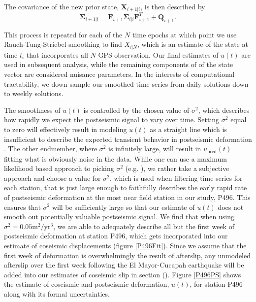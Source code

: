 \documentclass[12pt]{article}
\begin{document}
The covariance of the new prior state, $\mathbf{X}_{i+1|i}$, is then described by
\begin{equation}
  \mathbf{\Sigma}_{i+1|i} = \mathbf{F}_{i+1}\mathbf{\Sigma}_{i|i}\mathbf{F}^T_{i+1} + \mathbf{Q}_{i+1}.
\end{equation}

This process is repeated for each of the $N$ time epochs at which point we use Rauch-Tung-Striebel smoothing to find $X_{i|N}$, which is an estimate of the state at time $t_i$ that incorporates all $N$ GPS observation.  Our final estimates of $u(t)$ are used in subsequent analysis, while the remaining components of of the state vector are considered nuisance parameters. In the interests of computational tractability, we down sample our smoothed time series from daily solutions down to weekly solutions.




The smoothness of $u(t)$ is controlled by the chosen value of $\sigma^2$, which describes how rapidly we expect the postseismic signal to vary over time.  Setting $\sigma^2$ equal to zero will effectively result in modeling $u(t)$ as a straight line which is insufficient to describe the expected transient behavior in postseismic deformation \citep{Savage2005a}. The other endmember, where $\sigma^2$ is infinitely large, will result in $u_\mathrm{pred}(t)$ fitting what is obviously noise in the data. While one can use a maximum likelihood based approach to picking $\sigma^2$ (e.g. \citep{Segall1997}), we rather take a subjective approach and choose a value for $\sigma^2$, which is used when filtering time series for each station, that is just large enough to faithfully describes the early rapid rate of postseismic deformation at the most near field station in our study, P496.  This ensures that $\sigma^2$ will be sufficiently large so that our estimate of $u(t)$ does not smooth out potentially valuable postseismic signal. We find that when using $\sigma^2 = 0.05 \mathrm{m}^2 / \mathrm{yr}^3$, we are able to adequately describe all but the first week of postseismic deformation at station P496, which gets incorporated into our estimate of coseismic displacements (figure \ref{P496Fit}).  Since we assume that the first week of deformation is overwhelmingly the result of afterslip, any unmodeled afterslip over the first week following the El Mayor-Cucapah earthquake will be added into our estimates of coseismic slip in section ().  Figure \ref{P496PS} shows the estimate of coseismic and postseismic deformation, $u(t)$, for station P496 along with its formal uncertainties. 
\end{document}
